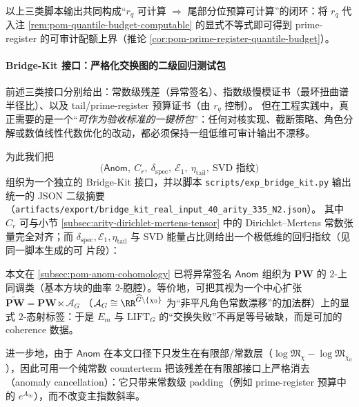 以上三类脚本输出共同构成“\(r_q\) 可计算 \(\Rightarrow\) 尾部分位预算可计算”的闭环：将 \(r_q\) 代入注 \ref{rem:pom-quantile-budget-computable} 的显式不等式即可得到 prime-register 的可审计配额上界（推论 \ref{cor:pom-prime-register-quantile-budget}）。

\paragraph{Bridge-Kit 接口：严格化交换图的二级回归测试包}
前述三类接口分别给出：常数级残差（异常签名）、指数级慢模证书（最坏扭曲谱半径比）、以及 tail/prime-register 预算证书（由 \(r_q\) 控制）。
但在工程实践中，真正需要的是一个“\emph{可作为验收标准的一键桥包}”：任何对核实现、截断策略、角色分解或数值线性代数优化的改动，都必须保持一组低维可审计输出不漂移。
\par
为此我们把
\[
\bigl(\mathsf{Anom},\ C_r,\ \delta_{\mathrm{spec}},\ \mathcal{E}_1,\ \eta_{\mathrm{tail}},\ \text{SVD 指纹}\bigr)
\]
组织为一个独立的 Bridge-Kit 接口，并以脚本
\texttt{scripts/exp\_bridge\_kit.py}
输出统一的 JSON 二级摘要（\texttt{artifacts/export/bridge\_kit\_real\_input\_40\_arity\_335\_N2.json}）。
其中 \(C_r\) 可与小节 \ref{subsec:arity-dirichlet-mertens-tensor} 中的 Dirichlet--Mertens 常数张量完全对齐；而 \(\delta_{\mathrm{spec}},\mathcal{E}_1,\eta_{\mathrm{tail}}\) 与 SVD 能量占比则给出一个极低维的回归指纹（见同一脚本生成的可 \verb|| 片段）：


\begin{remark}\label{rem:pom-bridge-kit-strictification}
本文在 \ref{subsec:pom-anom-cohomology} 已将异常签名 \(\mathsf{Anom}\) 组织为 \(\mathbf{PW}\) 的 \(2\)-上同调类（基本方块的曲率 \(2\)-胞腔）。等价地，可把其视为一个中心扩张
\(
\widetilde{\mathbf{PW}}=\mathbf{PW}\ltimes \mathcal{A}_G
\)
（\(\mathcal{A}_G\cong\RR^{\widehat G\setminus\{\chi_0\}}\) 为“非平凡角色常数漂移”的加法群）上的显式 \(2\)-态射标签：于是 \(E_m\) 与 \(\mathrm{LIFT}_G\) 的“交换失败”不再是等号破缺，而是可加的 coherence 数据。
\par
进一步地，由于 \(\mathsf{Anom}\) 在本文口径下只发生在有限部/常数层（\(\log\mathfrak{M}_\chi-\log\mathfrak{M}_{\chi_0}\)），因此可用一个纯常数 counterterm 把该残差在有限部接口上严格消去（anomaly cancellation）：它只带来常数级 padding（例如 prime-register 预算中的 \(e^{A_\infty}\)），而不改变主指数斜率。
\end{remark}

